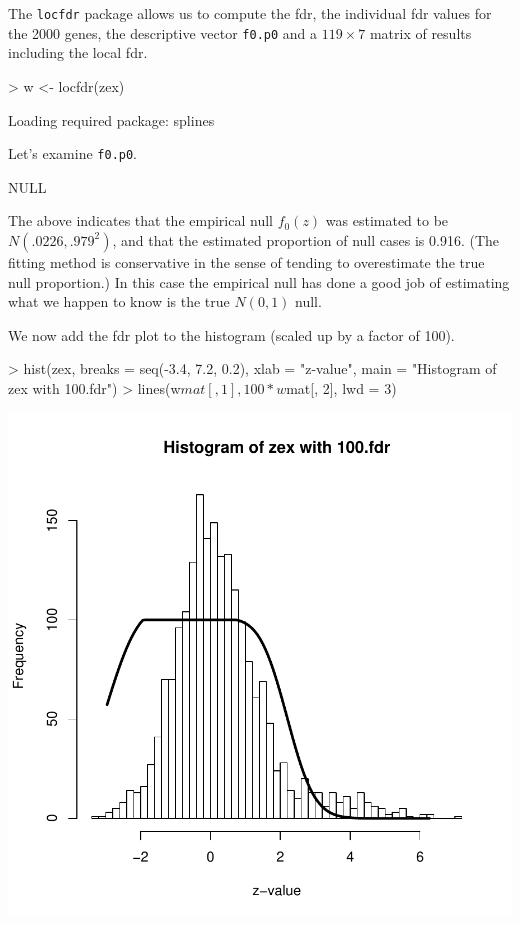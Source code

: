 \documentclass[11pt]{article}
\begin{document}
The \texttt{locfdr} package allows us to compute the fdr, the
individual fdr values for the 2000 genes, the descriptive vector
\texttt{f0.p0} and a $119\times 7$ matrix of results including the
local fdr. 

\begin{Schunk}
\begin{Sinput}
> w <- locfdr(zex)
\end{Sinput}
\begin{Soutput}
Loading required package: splines
\end{Soutput}
\end{Schunk}

Let's examine \texttt{f0.p0}. 

\begin{Schunk}
\begin{Soutput}
NULL
\end{Soutput}
\end{Schunk}

The above indicates that the empirical null $f_0(z)$ was estimated to
be $N(.0226,.979^2)$, and that the estimated proportion of null cases
is 0.916. (The fitting method is conservative in the sense of tending
to overestimate the true null proportion.) In this case the empirical
null has done a good job of estimating what we happen to know is the
true $N(0,1)$ null.

We now add the fdr plot to the histogram (scaled up by a factor of
100).

\begin{Schunk}
\begin{Sinput}
> hist(zex, breaks = seq(-3.4, 7.2, 0.2), xlab = "z-value", main = "Histogram of zex with 100.fdr")
> lines(w$mat[, 1], 100 * w$mat[, 2], lwd = 3)
\end{Sinput}
\end{Schunk}
\includegraphics{locfdr-example-FDR-Plot}
\end{document}
